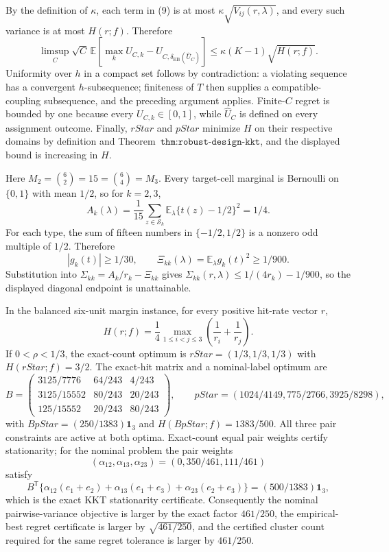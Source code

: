 By the definition of \(\kappa\), each term in (9) is at most \(\kappa\sqrt{V_{ij}(r,\lambda)}\), and every such variance is at most \(H(r;f)\). Therefore
\[
\limsup_C\sqrt C\,\mathbb E\left[\max_kU_{C,k}-U_{C,\delta_{\mathrm{EB}}(\widehat U_C)}\right]
\le\kappa(K-1)\sqrt{H(r;f)}.
\]
Uniformity over \(h\) in a compact set follows by contradiction: a violating sequence has a convergent \(h\)-subsequence; finiteness of \(T\) then supplies a compatible-coupling subsequence, and the preceding argument applies. Finite-\(C\) regret is bounded by one because every \(U_{C,k}\in[0,1]\), while \(\widehat U_C\) is defined on every assignment outcome. Finally, \(rStar\) and \(pStar\) minimize \(H\) on their respective domains by definition and Theorem~\(\texttt{thm:robust-design-kkt}\), and the displayed bound is increasing in \(H\).

Here \(M_2={6\choose2}=15={6\choose4}=M_3\). Every target-cell marginal is Bernoulli on \(\{0,1\}\) with mean \(1/2\), so for \(k=2,3\),
\[
A_k(\lambda)=\frac1{15}\sum_{z\in\mathcal S_k}\mathbb E_\lambda\{t(z)-1/2\}^2=1/4.
\]
For each type, the sum of fifteen numbers in \(\{-1/2,1/2\}\) is a nonzero odd multiple of \(1/2\). Therefore
\[
|g_k(t)|\ge1/30,\qquad \Xi_{kk}(\lambda)=\mathbb E_\lambda g_k(t)^2\ge1/900.
\]
Substitution into \(\Sigma_{kk}=A_k/r_k-\Xi_{kk}\) gives \(\Sigma_{kk}(r,\lambda)\le1/(4r_k)-1/900\), so the displayed diagonal endpoint is unattainable.

In the balanced six-unit margin instance, for every positive hit-rate vector \(r\),
\[
H(r;f)=\frac14\max_{1\le i<j\le3}\left(\frac1{r_i}+\frac1{r_j}\right).
\]
If \(0<\rho<1/3\), the exact-count optimum is \(rStar=(1/3,1/3,1/3)\) with \(H(rStar;f)=3/2\). The exact-hit matrix and a nominal-label optimum are
\[
B=\begin{pmatrix}
3125/7776&64/243&4/243\\
3125/15552&80/243&20/243\\
125/15552&20/243&80/243
\end{pmatrix},\qquad
pStar=\left(1024/4149,775/2766,3925/8298\right),
\]
with \(BpStar=(250/1383)\mathbf1_3\) and \(H(BpStar;f)=1383/500\). All three pair constraints are active at both optima. Exact-count equal pair weights certify stationarity; for the nominal problem the pair weights
\[
(\alpha_{12},\alpha_{13},\alpha_{23})=(0,350/461,111/461)
\]
satisfy
\[
B^{\mathsf T}\{\alpha_{12}(e_1+e_2)+\alpha_{13}(e_1+e_3)+\alpha_{23}(e_2+e_3)\}=(500/1383)\mathbf1_3,
\]
which is the exact KKT stationarity certificate. Consequently the nominal pairwise-variance objective is larger by the exact factor \(461/250\), the empirical-best regret certificate is larger by \(\sqrt{461/250}\), and the certified cluster count required for the same regret tolerance is larger by \(461/250\).

